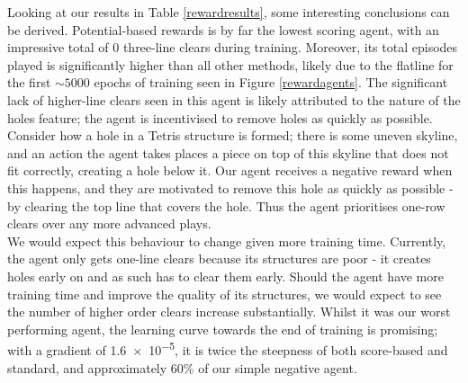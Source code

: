 \documentclass[12pt]{article}
\begin{document}
Looking at our results in Table \ref{rewardresults}, some interesting conclusions can be derived. Potential-based rewards is by far the lowest scoring agent, with an impressive total of 0 three-line clears during training. Moreover, its total episodes played is significantly higher than all other methods, likely due to the flatline for the first $\sim5000$ epochs of training seen in Figure \ref{rewardagents}. The significant lack of higher-line clears seen in this agent is likely attributed to the nature of the holes feature; the agent is incentivised to remove holes as quickly as possible. Consider how a hole in a Tetris structure is formed; there is some uneven skyline, and an action the agent takes places a piece on top of this skyline that does not fit correctly, creating a hole below it. Our agent receives a negative reward when this happens, and they are motivated to remove this hole as quickly as possible - by clearing the top line that covers the hole. Thus the agent prioritises one-row clears over any more advanced plays. 
\\\newline We would expect this behaviour to change given more training time. Currently, the agent only gets one-line clears because its structures are poor - it creates holes early on and as such has to clear them early. Should the agent have more training time and improve the quality of its structures, we would expect to see the number of higher order clears increase substantially. Whilst it was our worst performing agent, the learning curve towards the end of training is promising; with a gradient of \num{1.6e-5}, it is twice the steepness of both score-based and standard, and approximately 60\% of our simple negative agent. 
\end{document}
